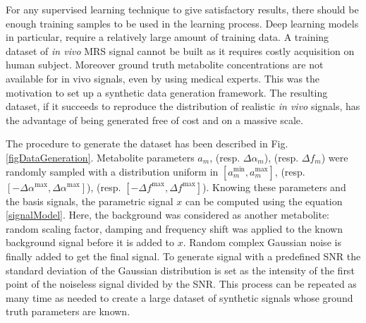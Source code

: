 \documentclass{llncs}
\begin{document}
For any supervised learning technique to give satisfactory results, 
there should be enough training samples to be used in the learning process. 
Deep learning models in particular, require a relatively large amount of training data. 
A training dataset of \textit{in vivo} MRS signal cannot be built as it requires costly acquisition on human subject. Moreover ground truth metabolite concentrations are not available for in vivo signals, even by using medical experts.
%
%
This was the motivation to set up a synthetic data generation framework. 
The resulting dataset, if it succeeds to reproduce the distribution of realistic \textit{in vivo }signals,
has the advantage of being generated free of cost and on a massive scale.

The procedure to generate the dataset has been described in Fig. \ref{figDataGeneration}.
Metabolite parameters $a_m$, (resp. $\Delta \alpha_m$), (resp. $\Delta f_m$)
were randomly sampled with a distribution uniform in $[a_m^\text{min},a_m^\text{max}]$, 
(resp. $[-\Delta \alpha^\text{max},\Delta \alpha^\text{max}]$), 
(resp. $[-\Delta f^\text{max},\Delta f^\text{max}]$).
Knowing these parameters and the basis signals, the parametric signal $x$ can be computed using the equation \ref{signalModel}.
Here, the background was considered as another metabolite: random scaling factor, damping and frequency shift was
applied to the known background signal before it is added to $x$.
Random complex Gaussian noise is finally added to get the final signal.
To generate signal with a predefined SNR the standard deviation of the Gaussian distribution is set as the intensity of the first point of the noiseless signal
divided by the SNR.
This process can be repeated as many time as needed to create a large dataset of synthetic signals whose ground truth parameters are known.
\end{document}
